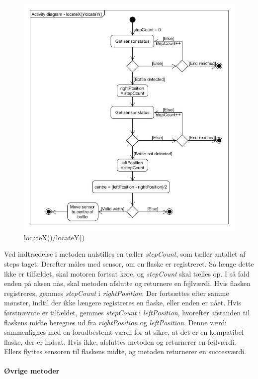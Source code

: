 \begin{figure}[H]
	\includegraphics[scale=0.5]{tex/Design/PSoC/AD_locate.jpg}
	\caption{locateX()/locateY()}
	\label{AD_locate}
\end{figure}

Ved indtrædelse i metoden nulstilles en tæller \textit{stepCount}, som tæller antallet af steps taget. Derefter måles med sensor, om en flaske er registreret. Så længe dette ikke er tilfældet, skal motoren fortsat køre, og \textit{stepCount} skal tælles op. I så fald enden på aksen nås, skal metoden afslutte og returnere en fejlværdi. Hvis flasken registreres, gemmes \textit{stepCount} i \textit{rightPosition}. Der fortsættes efter samme mønster, indtil der ikke længere registreres en flaske, eller enden er nået. Hvis førstnævnte er tilfældet, gemmes \textit{stepCount} i \textit{leftPosition}, hvorefter afstanden til flaskens midte beregnes ud fra \textit{rightPosition} og \textit{leftPosition}. Denne værdi sammenlignes med en forudbestemt værdi for at sikre, at det er en kompatibel flaske, der er indsat. Hvis ikke, afsluttes metoden og returnerer en fejlværdi. Ellers flyttes sensoren til flaskens midte, og metoden returnerer en succesværdi.
\\
\\
\textbf{Øvrige metoder}

